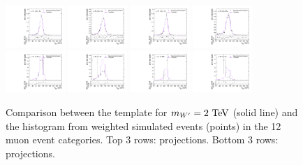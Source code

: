 \begin{figure}[htpb]
  \includegraphics[width=0.2\textwidth]{fig/2Dfit/templateVsReco_WprToWZ2000_r0_MJ_mu_HP_nobb_LDy.pdf}
  \includegraphics[width=0.2\textwidth]{fig/2Dfit/templateVsReco_WprToWZ2000_r0_MJ_mu_LP_nobb_LDy.pdf}
  \includegraphics[width=0.2\textwidth]{fig/2Dfit/templateVsReco_WprToWZ2000_r0_MJ_mu_HP_nobb_HDy.pdf}
  \includegraphics[width=0.2\textwidth]{fig/2Dfit/templateVsReco_WprToWZ2000_r0_MJ_mu_LP_nobb_HDy.pdf}\\
  \includegraphics[width=0.2\textwidth]{fig/2Dfit/templateVsReco_WprToWZ2000_r0_MJ_mu_HP_vbf_LDy.pdf}
  \includegraphics[width=0.2\textwidth]{fig/2Dfit/templateVsReco_WprToWZ2000_r0_MJ_mu_LP_vbf_LDy.pdf}
  \includegraphics[width=0.2\textwidth]{fig/2Dfit/templateVsReco_WprToWZ2000_r0_MJ_mu_HP_vbf_HDy.pdf}
  \includegraphics[width=0.2\textwidth]{fig/2Dfit/templateVsReco_WprToWZ2000_r0_MJ_mu_LP_vbf_HDy.pdf}\\
  \caption{
    Comparison between the \DY\WprtoWZ template for $m_{\Wpr}=2\unit{TeV}$ (solid line) and the histogram from weighted simulated events (points) in the 12 muon event categories.
    Top 3 rows: \MVV projections.
    Bottom 3 rows: \MJ projections.
  }
  \label{fig:1dtemplateVsReco_WprToWZ2000_Run2}
\end{figure}

